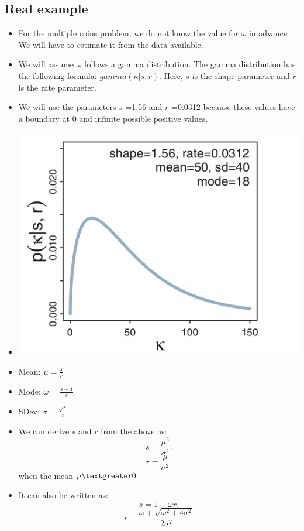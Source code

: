 \documentclass{article}
\begin{document}
\subsection{Real example}
\begin{itemize}
    \item For the multiple coins problem, we do not know the value for $\omega$ in advance. We will have to estimate it from the data available.
    \item We will assume $\omega$ follows a gamma distribution. The gamma distribution has the following formula: $gamma(\kappa|s, r)$. Here, $s$ is the shape parameter and $r$ is the rate parameter. 
    \item We will use the parameters $s$ =1.56 and $r$ =0.0312 because these values have a boundary at 0 and infinite possible positive values.  
    \item \includegraphics[scale=0.3]{gamma_distribution}
    \item Mean: $\mu = \frac{s}{r}$ 
    \item Mode: $\omega = \frac{s-1}{r}$
    \item SDev: $\sigma = \frac{\sqrt{s}}{r}$
    \item We can derive $s$ and $r$ from the above as:
        \[
            s = \frac{\mu^2}{\sigma^2} 
        .\] 
        \[
            r = \frac{\mu}{\sigma^2}
        .\] 
        when the mean $\mu \textgreater 0$
    \item It can also be written as:
        \[
            s = 1 + \omega r
        .\] 
        \[
            r = \frac{\omega + \sqrt{\omega^2 + 4\sigma^2}}{2\sigma^2} 
\]
\end{itemize}
\end{document}
